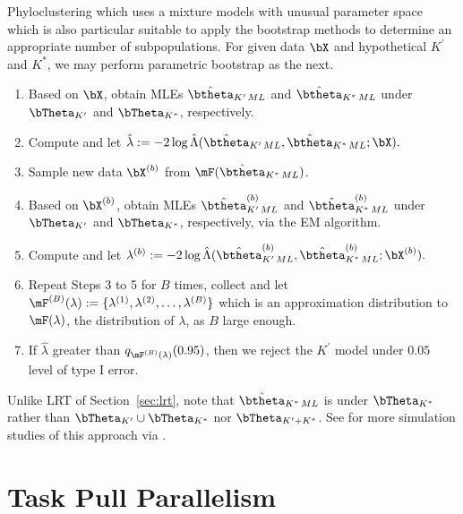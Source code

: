 Phyloclustering which uses a mixture models with unusual parameter space
which is also particular suitable to apply the bootstrap methods to determine
an appropriate number of subpopulations.
For given data $\bX$ and hypothetical $K^\prime$ and $K^*$,
we may perform parametric bootstrap as the next.
\begin{enumerate}[label=Step \arabic*:]
\item
Based on $\bX$,
obtain MLEs $\hat{\btheta}_{K^\prime\,ML}$ and $\hat{\btheta}_{K^*\,ML}$
under $\bTheta_{K^\prime}$ and $\bTheta_{K^*}$, respectively.

\item
Compute and let
$
  \hat{\lambda} :=
  -2\log \hat{\Lambda}
  (\hat{\btheta}_{K^\prime\,ML},
   \hat{\btheta}_{K^*\,ML}; \bX).
$

\item
Sample new data $\bX^{(b)}$ from $\mF(\hat{\btheta}_{K^*\,ML})$.

\item
Based on $\bX^{(b)}$,
obtain MLEs $\hat{\btheta}^{(b)}_{K^\prime\,ML}$ and
$\hat{\btheta}^{(b)}_{K^*\,ML}$
under $\bTheta_{K^\prime}$ and $\bTheta_{K^*}$, respectively,
via the EM algorithm.

\item
Compute and let
$
  \lambda^{(b)} :=
  -2\log \hat{\Lambda}
  (\hat{\btheta}^{(b)}_{K^\prime\,ML},
   \hat{\btheta}^{(b)}_{K^*\,ML}; \bX^{(b)}).
$

\item
Repeat Steps 3 to 5 for $B$ times, collect and let
$\mF^{(B)}(\lambda) := \{\lambda^{(1)}, \lambda^{(2)}, \ldots, \lambda^{(B)}\}$
which is an approximation distribution to $\mF(\lambda)$,
the distribution of $\lambda$, as $B$ large enough.

\item
If $\hat{\lambda}$ greater than $q_{\mF^{(B)}(\lambda)}(0.95)$, then
we reject the $K^\prime$ model under $0.05$ level of type I error.

\end{enumerate}
Unlike LRT of Section~\ref{sec:lrt}, note that
$\hat{\btheta}_{K^*\,ML}$ is under $\bTheta_{K^*}$ rather than
$\bTheta_{K^\prime} \cup \bTheta_{K^*}$ nor $\bTheta_{K^\prime + K^*}$.
See \citet{Chen2011a} for more simulation studies of this approach via
.




\section{Task Pull Parallelism}
\label{sec:task_pull}


